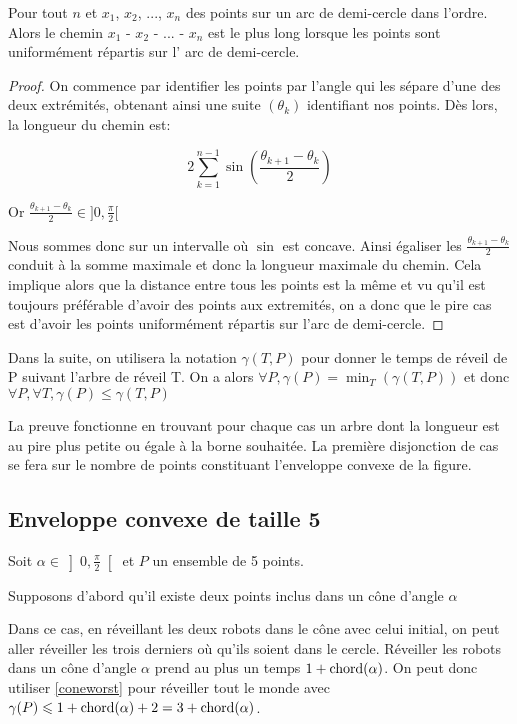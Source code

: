 \begin{lemma}\label{worstchord}
Pour tout $n$ et $x_1$, $x_2$, ..., $x_n$ des points sur un arc de demi-cercle dans l'ordre. Alors le chemin $x_1$ - $x_2$ - ... - $x_n$ est le plus long lorsque les points sont uniformément répartis sur l' arc de demi-cercle.
\end{lemma}
\begin{proof}
On commence par identifier les points par l'angle qui les sépare d'une des deux extrémités, obtenant ainsi une suite $\left(\theta_k\right)$ identifiant nos points. Dès lors, la longueur du chemin est:

$$2\sum_{k=1}^{n-1} \sin\left(\frac{\theta_{k+1} - \theta_k}{2}\right)$$

Or $\frac{\theta_{k+1} - \theta_k}{2} \in ]0, \frac{\pi}{2}[$

Nous sommes donc sur un intervalle où $\sin$ est concave. Ainsi égaliser les $\frac{\theta_{k+1} - \theta_k}{2}$ conduit à la somme maximale et donc la longueur maximale du chemin. 
Cela implique alors que la distance entre tous les points est la même et vu qu'il est toujours préférable d'avoir des points aux extremités, on a donc que le pire cas est d'avoir les points uniformément répartis sur l'arc de demi-cercle.

\end{proof}

Dans la suite, on utilisera la notation $\gamma(T, P)$ pour donner le temps de réveil de P suivant l'arbre de réveil T.
On a alors $\forall P, \gamma(P) = \min_T(\gamma(T,P))$
et donc $\forall P, \forall T, \gamma(P) \leq \gamma(T, P)$

La preuve fonctionne en trouvant pour chaque cas un arbre dont la longueur est au pire plus petite ou égale à la borne souhaitée. La première disjonction de cas se fera sur le nombre de points constituant l'enveloppe convexe de la figure.

\subsection{Enveloppe convexe de taille 5}\label{conv5}

Soit $\alpha \in \left]0, \frac{\pi}{2}\right[$ et $P$ un ensemble de 5 points.

\begin{lemma}\label{conealphachord}
Supposons d'abord qu'il existe deux points inclus dans un cône d'angle $\alpha$

Dans ce cas, en réveillant les deux robots dans le cône avec celui initial, on peut aller réveiller les trois derniers où qu'ils soient dans le cercle. Réveiller les robots dans un cône d'angle $\alpha$ prend au plus un temps $1 + \operatorname{chord}(\alpha)$.
On peut donc utiliser \cref{coneworst} pour réveiller tout le monde avec $\gamma(P) \leqslant 1 + \operatorname{chord}(\alpha) + 2 = 3 + \operatorname{chord}(\alpha)$.
\end{lemma}

